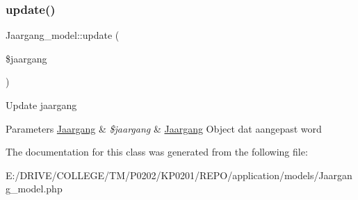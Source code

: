 \subsubsection{\texorpdfstring{update()}{update()}}
{\footnotesize\ttfamily Jaargang\+\_\+model\+::update (\begin{DoxyParamCaption}\item[{}]{\$jaargang }\end{DoxyParamCaption})}

Update jaargang 
\begin{DoxyParams}[1]{Parameters}
\mbox{\hyperlink{class_jaargang}{Jaargang}} & {\em \$jaargang} & \mbox{\hyperlink{class_jaargang}{Jaargang}} Object dat aangepast word \\
\hline
\end{DoxyParams}


The documentation for this class was generated from the following file\+:\begin{DoxyCompactItemize}
\item 
E\+:/\+D\+R\+I\+V\+E/\+C\+O\+L\+L\+E\+G\+E/\+T\+M/\+P0202/\+K\+P0201/\+R\+E\+P\+O/application/models/Jaargang\+\_\+model.\+php\end{DoxyCompactItemize}
